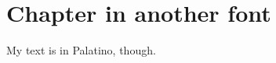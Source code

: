 \documentclass[12pt]{book}
\begin{document}
\chapter{Chapter in another font}
My text is in Palatino, though.
\end{document}

